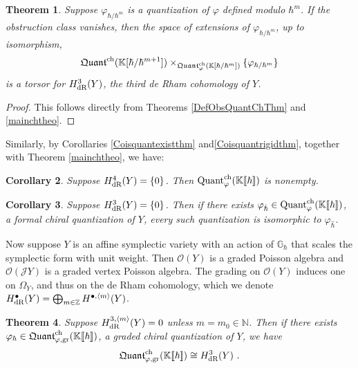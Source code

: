 \documentclass[11pt]{amsart}
\numberwithin{equation}{section}
\newtheorem{theo}{Theorem}[section]
\newtheorem{coro}[theo]{Corollary}
\theoremstyle{definition}
\newtheorem{eg}[theo]{Example}
\newcommand{\bb}{\mathbb}
\newcommand{\mc}{\mathcal}
\newcommand{\fph}{{[\![\hbar]\!]}}
\newcommand{\gd}{{\textup{gr}}}
\newcommand{\ik}{{\bb K}}
\newcommand{\Quant}{{\textup{Quant}}}
\newcommand{\fQuant}{{\mathfrak{Quant}}}
\newcommand{\dR}{{\textup{dR}}}
\newcommand{\ch}{{\textup{ch}}}
\newcommand{\0}{{\textbf{0}}}
\def\IN{\mathbb{N}}
\def\IZ{\mathbb{Z}}
\def\IG{\mathbb{G}}
\def\JJ{{\mc J}}
\def\OO{{\mc O}}
\def\ch{{\rm ch}}
\def \vph{\varphi_{\hat \hbar}}
\begin{document}
\begin{theo}\label{symptheo}
	  Suppose $\varphi_{\hbar/\hbar^m}$ is a quantization of $\varphi$ defined modulo $\hbar^m$. If the obstruction class vanishes, then the space of extensions of $\varphi_{\hbar/\hbar^m}$, up to isomorphism,
	\[
	\fQuant^\ch(\ik[\hbar/\hbar^{m+1}])\times_{\fQuant_{\varphi}^\ch(\ik[\hbar/\hbar^m])}\{\varphi_{\hbar/\hbar^m}\}
	\]
	is a torsor for $H^3_{\dR}(Y)$, the third de Rham cohomology of $Y$.
\end{theo}
\begin{proof}
	This follows directly from Theorems \ref{DefObsQuantChThm} and \ref{mainchtheo}.
\end{proof}

Similarly, by Corollaries \ref{Coisquantexistthm} and\ref{Coisquantrigidthm}, together with Theorem \ref{mainchtheo}, we have:

\begin{coro} Suppose $H^4_\dR(Y)=\{0\}$. Then $\Quant^\ch_\varphi(\ik\fph)$ is nonempty.
\end{coro}


\begin{coro} Suppose $H^3_\dR(Y)=\{0\}$. Then if there exists $\vph\in\Quant^\ch_\varphi(\ik\fph)$, a formal chiral quantization of $Y$, every such quantization is isomorphic to $\vph$.
\end{coro}

Now suppose $Y$ is an affine symplectic variety with an action of $\IG_\hbar$ that scales the symplectic form with unit weight. Then $\OO(Y)$ is a graded Poisson algebra and $\OO(\JJ Y)$ is a graded vertex Poisson algebra. The grading on $\OO(Y)$ induces one on $\Omega_Y$, and thus on the de Rham cohomology, which we denote $H^\bullet_\dR(Y) = \bigoplus_{m\in \IZ}H^{\bullet,\langle m \rangle}(Y)$.

\begin{theo}
	Suppose $H^{3,\langle m \rangle}_\dR(Y) =0 $ unless $m=m_0\in \IN$. Then if there exists $\varphi_\hbar \in \fQuant^\ch_{\varphi,\gd}(\ik\fph)$, a graded chiral quantization of $Y$, we have
	\[
	\fQuant^\ch_{\varphi,\gd}(\ik\fph)  \cong H^3_\dR(Y)~.
	\]
\end{theo}





%
%
\end{document}
